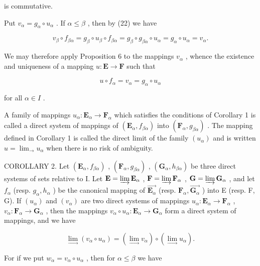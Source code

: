 is commutative.

Put \(v_{\alpha} = g_{\alpha} \circ u_{\alpha}\) . If \(\alpha \leqslant \beta\) , then by (22) we have

\[
v _ {\beta} \circ f _ {\beta \alpha} = g _ {\beta} \circ u _ {\beta} \circ f _ {\beta \alpha} = g _ {\beta} \circ g _ {\beta \alpha} \circ u _ {\alpha} = g _ {\alpha} \circ u _ {\alpha} = v _ {\alpha}.
\]

We may therefore apply Proposition 6 to the mappings \(v_{\alpha}\) , whence the existence and uniqueness of a mapping \(u: \mathbf{E} \to \mathbf{F}\) such that

\[
u \circ f _ {\alpha} = v _ {\alpha} = g _ {\alpha} \circ u _ {\alpha}
\]

for all \(\alpha \in I\) .

A family of mappings \(u_{\alpha} \colon \mathbf{E}_{\alpha} \to \mathbf{F}_{\alpha}\) which satisfies the conditions of Corollary 1 is called a direct system of mappings of \((\mathbf{E}_{\alpha}, f_{\beta \alpha})\) into \((\mathbf{F}_{\alpha}, g_{\beta \alpha})\) . The mapping defined in Corollary 1 is called the direct limit of the family \((u_{\alpha})\) and is written \(u = \lim_{\rightarrow} u_{\alpha}\) when there is no risk of ambiguity.

COROLLARY 2. Let \((\mathbf{E}_{\alpha}, f_{\beta \alpha})\) , \((\mathbf{F}_{\alpha}, g_{\beta \alpha})\) , \((\mathbf{G}_{\alpha}, h_{\beta \alpha})\) be three direct systems of sets relative to I. Let \(\mathbf{E} = \varinjlim \mathbf{E}_{\alpha}\) , \(\mathbf{F} = \varinjlim \mathbf{F}_{\alpha}\) , \(\mathbf{G} = \varinjlim \mathbf{G}_{\alpha}\) , and let \(f_{\alpha}\) (resp. \(g_{\alpha}, h_{\alpha}\) ) be the canonical mapping of \(\overrightarrow{\mathbf{E}_{\alpha}}\) (resp. \(\mathbf{F}_{\alpha}, \overrightarrow{\mathbf{G}_{\alpha}}\) ) into E (resp. F, G). If \((u_{\alpha})\) and \((v_{\alpha})\) are two direct systems of mappings \(u_{\alpha}: \mathbf{E}_{\alpha} \to \mathbf{F}_{\alpha}\) , \(v_{\alpha}: \mathbf{F}_{\alpha} \to \mathbf{G}_{\alpha}\) , then the mappings \(v_{\alpha} \circ u_{\alpha}: \mathbf{E}_{\alpha} \to \mathbf{G}_{\alpha}\) form a direct system of mappings, and we have

\[
\lim _ {\rightarrow} \left(v _ {\alpha} \circ u _ {\alpha}\right) = (\lim _ {\rightarrow} v _ {\alpha}) \circ (\lim _ {\rightarrow} u _ {\alpha}).\tag{25}
\]

For if we put \(w_{\alpha} = v_{\alpha} \circ u_{\alpha}\) , then for \(\alpha \leqslant \beta\) we have

